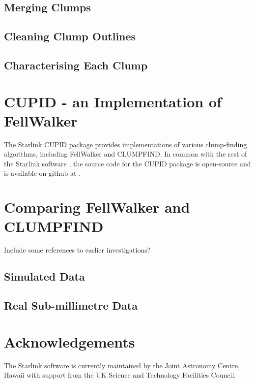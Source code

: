 \documentclass[final,authoryear,5p,times,twocolumn]{elsarticle}
\begin{document}
\subsection{Merging Clumps}

\subsection{Cleaning Clump Outlines}

\subsection{Characterising Each Clump}


\section{CUPID - an Implementation of FellWalker}
The Starlink CUPID package \citep[][ascl:1311.007]{CupidAdass,SUN255} provides
implementations of various clump-finding algorithms, including FellWalker
and CLUMPFIND. In common with the rest of the Starlink software \citep[][ascl:1110.012]{StarlinkAdass},
the source code for the CUPID package is open-source and is available on github at
.

\section{Comparing FellWalker and CLUMPFIND}

Include some references to earlier investigations? \citep[e.g.][]{2010Watson}

\subsection{Simulated Data}

\subsection{Real Sub-millimetre Data}


\section{Acknowledgements}

The Starlink software is currently maintained by the Joint Astronomy
Centre, Hawaii with support from the UK Science and Technology
Facilities Council.
\end{document}
